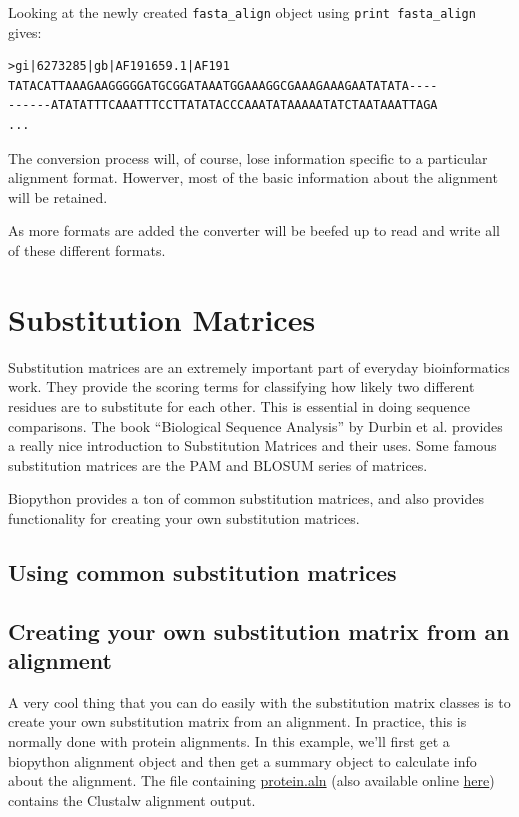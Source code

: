 \documentclass{report}
\begin{document}
Looking at the newly created \verb|fasta_align| object using \verb|print fasta_align| gives:

\begin{verbatim}
>gi|6273285|gb|AF191659.1|AF191
TATACATTAAAGAAGGGGGATGCGGATAAATGGAAAGGCGAAAGAAAGAATATATA----
------ATATATTTCAAATTTCCTTATATACCCAAATATAAAAATATCTAATAAATTAGA
...
\end{verbatim}

The conversion process will, of course, lose information specific to a particular alignment format. Howerver, most of the basic information about the alignment will be retained.


As more formats are added the converter will be beefed up to read and write all of these different formats.

\section{Substitution Matrices}
\label{sec:sub_matrix}

Substitution matrices are an extremely important part of everyday bioinformatics work. They provide the scoring terms for classifying how likely two different residues are to substitute for each other. This is essential in doing sequence comparisons. The book ``Biological Sequence Analysis'' by Durbin et al. provides a really nice introduction to Substitution Matrices and their uses. Some famous substitution matrices are the PAM and BLOSUM series of matrices.


Biopython provides a ton of common substitution matrices, and also provides functionality for creating your own substitution matrices.

\subsection{Using common substitution matrices}

\subsection{Creating your own substitution matrix from an alignment}
\label{sec:subs_mat_ex}

A very cool thing that you can do easily with the substitution matrix
classes is to create your own substitution matrix from an
alignment. In practice, this is normally done with protein
alignments. In this example, we'll first get a biopython alignment
object and then get a summary object to calculate info about the
alignment. The file containing \href{examples/protein.aln}{protein.aln}
(also available online
\href{http://biopython.org/DIST/docs/tutorial/examples/protein.aln}{here})
contains the Clustalw alignment output.
\end{document}
